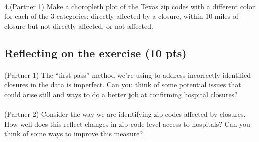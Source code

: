 \documentclass[
  letterpaper,
  DIV=11,
  numbers=noendperiod]{scrartcl}
\makeatletter
\let\oldparagraph\paragraph
\renewcommand{\paragraph}{
    \@ifstar
      \xxxParagraphStar
      \xxxParagraphNoStar
  }
\newcommand{\xxxParagraphStar}[1]{\oldparagraph*{#1}\mbox{}}
\newcommand{\xxxParagraphNoStar}[1]{\oldparagraph{#1}\mbox{}}
\makeatother
\begin{document}
\paragraph{4.(Partner 1) Make a choropleth plot of the Texas zip codes
with a different color for each of the 3 categories: directly affected
by a closure, within 10 miles of closure but not directly affected, or
not
affected.}\label{partner-1-make-a-choropleth-plot-of-the-texas-zip-codes-with-a-different-color-for-each-of-the-3-categories-directly-affected-by-a-closure-within-10-miles-of-closure-but-not-directly-affected-or-not-affected.}

\subsection{Reflecting on the exercise (10
pts)}\label{reflecting-on-the-exercise-10-pts}

\paragraph{(Partner 1) The ``first-pass'' method we're using to address
incorrectly identified closures in the data is imperfect. Can you think
of some potential issues that could arise still and ways to do a better
job at confirming hospital
closures?}\label{partner-1-the-first-pass-method-were-using-to-address-incorrectly-identified-closures-in-the-data-is-imperfect.-can-you-think-of-some-potential-issues-that-could-arise-still-and-ways-to-do-a-better-job-at-confirming-hospital-closures}

\paragraph{(Partner 2) Consider the way we are identifying zip codes
affected by closures. How well does this reflect changes in
zip-code-level access to hospitals? Can you think of some ways to
improve this
measure?}\label{partner-2-consider-the-way-we-are-identifying-zip-codes-affected-by-closures.-how-well-does-this-reflect-changes-in-zip-code-level-access-to-hospitals-can-you-think-of-some-ways-to-improve-this-measure}
\end{document}
